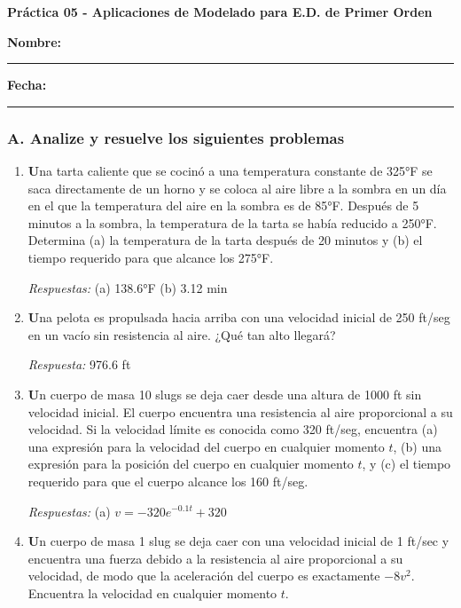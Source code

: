 \documentclass[a4paper,12pt]{article}
\begin{document}
\begin{center}
    \Large\textbf{Práctica 05 - Aplicaciones de Modelado para E.D. de Primer Orden}\\[1cm]  

\end{center}
  \textbf{Nombre:} \rule{9cm}{0.4pt}  \textbf{Fecha:} \rule{4.5cm}{0.4pt}



\subsubsection*{A. Analize y resuelve los siguientes problemas}

\begin{enumerate}

    \item \textbf Una tarta caliente que se cocinó a una temperatura constante de 325°F se saca directamente de un horno y se coloca al aire libre a la sombra en un día en el que la temperatura del aire en la sombra es de 85°F. Después de 5 minutos a la sombra, la temperatura de la tarta se había reducido a 250°F. Determina (a) la temperatura de la tarta después de 20 minutos y (b) el tiempo requerido para que alcance los 275°F.

\textit{Respuestas:}  
(a) 138.6°F  
(b) 3.12 min
    \item \textbf Una pelota es propulsada hacia arriba con una velocidad inicial de 250 ft/seg en un vacío sin resistencia al aire. ¿Qué tan alto llegará?

\textit{Respuesta:}  
976.6 ft
    \item \textbf  Un cuerpo de masa 10 slugs se deja caer desde una altura de 1000 ft sin velocidad inicial. El cuerpo encuentra una resistencia al aire proporcional a su velocidad. Si la velocidad límite es conocida como 320 ft/seg, encuentra (a) una expresión para la velocidad del cuerpo en cualquier momento \(t\), (b) una expresión para la posición del cuerpo en cualquier momento \(t\), y (c) el tiempo requerido para que el cuerpo alcance los 160 ft/seg.

\textit{Respuestas:}  
(a) \(v = -320e^{-0.1t} + 320\)  
    \item \textbf Un cuerpo de masa 1 slug se deja caer con una velocidad inicial de 1 ft/sec y encuentra una fuerza debido a la resistencia al aire proporcional a su velocidad, de modo que la aceleración del cuerpo es exactamente \( -8v^2 \). Encuentra la velocidad en cualquier momento \(t\).


\end{enumerate}
\end{document}
